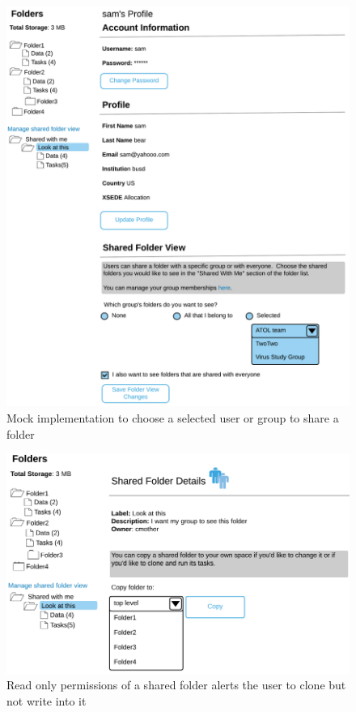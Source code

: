 \documentclass[sigconf]{acmart}
\begin{document}
\begin{figure}
\includegraphics[width=\columnwidth]{figures/cipres-mock-2.pdf}
\caption{Mock implementation to choose a selected user or group to share a folder}
\end{figure}

\begin{figure}
\includegraphics[width=\columnwidth]{figures/cipres-mock-3.pdf}
\caption{Read only permissions of a shared folder alerts the user to clone but not write into it}
\end{figure}
\end{document}
